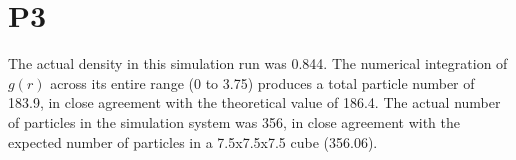 \documentclass[a4paper,11pt]{article}
\numberwithin{equation}{section}
\begin{document}
\section{P3}
The actual density in this simulation run was 0.844.
The numerical integration of $g(r)$ across its entire range (0 to 3.75) produces a total particle number of 183.9, in close agreement with the theoretical value of 186.4.
The actual number of particles in the simulation system was 356, in close agreement with the expected number of particles in a 7.5x7.5x7.5 cube (356.06).
\end{document}
